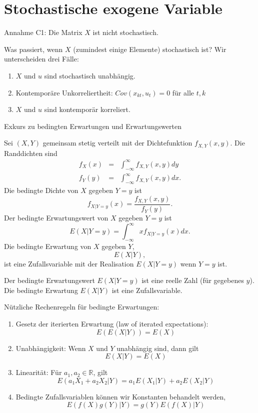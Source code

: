 \documentclass{article}
\begin{document}
\section{Stochastische exogene Variable}

Annahme C1: Die Matrix $X$ ist nicht stochastisch.

Was passiert, wenn $X$ (zumindest einige Elemente) stochastisch ist?
Wir unterscheiden drei Fälle:

\begin{enumerate}
	\item $X$ und $u$ sind stochastisch unabhängig.
	\item Kontemporäre Unkorreliertheit: $Cov(x_{kt},u_{t})=0$ für alle $t,k$
	\item $X$ und $u$ sind kontemporär korreliert.
\end{enumerate}

Exkurs zu bedingten Erwartungen und Erwartungswerten

Sei $(X,Y)$ gemeinsam stetig verteilt mit der Dichtefunktion $f_{X,Y}(x,y)$.
Die Randdichten sind
\begin{eqnarray*}
	f_{X}(x) &=&\int_{-\infty }^{\infty }f_{X,Y}(x,y)dy \\
	f_{Y}(y) &=&\int_{-\infty }^{\infty }f_{X,Y}(x,y)dx.
\end{eqnarray*}
Die bedingte Dichte von $X$ gegeben $Y=y$ ist
\[ f_{X|Y=y}\left( x\right) =\frac{f_{X,Y}(x,y)}{f_{Y}(y)}. \]
Der bedingte Erwartungswert von $X$ gegeben $Y=y$ ist
\[ E(X|Y=y) =\int_{-\infty }^{\infty }xf_{X|Y=y}\left( x\right) dx. \]
Die bedingte Erwartung von $X$ gegeben $Y$,
\[ E(X|Y), \]
ist eine Zufallsvariable mit der Realisation $E(X|Y=y)$ wenn $Y=y$ ist.

Der bedingte Erwartungswert $E(X|Y=y)$ ist eine reelle Zahl (für gegebenes $y$).
Die bedingte Erwartung $E(X|Y)$ ist eine Zufallsvariable.

Nützliche Rechenregeln für bedingte Erwartungen:

\begin{enumerate}
	\item Gesetz der iterierten Erwartung (law of iterated expectations): 
	\[ E(E(X|Y)) =E(X) \]
	\item Unabhängigkeit: Wenn $X$ und $Y$ unabhängig sind, dann gilt
	\[ E(X|Y) =E(X) \]
	\item Linearität: Für $a_{1},a_{2}\in \mathbb{R}$, gilt
	\[ E(a_{1}X_{1}+a_{2}X_{2}|Y) =a_{1}E(X_{1}|Y)+a_{2}E(X_{2}|Y) \]
	\item Bedingte Zufallsvariablen können wir Konstanten behandelt werden,
	\[ E(f(X)g(Y)|Y) =g(Y)E(f(X)|Y) \]
\end{enumerate}
\end{document}
